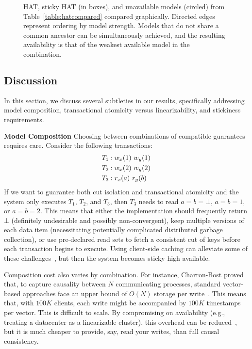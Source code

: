 \begin{figure}[t!]
\label{fig:hat-order}
\caption{HAT, sticky HAT (in boxes), and unavailable models (circled)
  from Table~\protect\ref{table:hatcompared} compared
  graphically. Directed edges represent ordering by model
  strength. Models that do not share a common ancestor can be
  simultaneously achieved, and the resulting availability is that of
  the weakest available model in the combination.}
\label{fig:hatcompared}
\end{figure}


\subsection{Discussion}
\label{sec:discussion}

In this section, we discuss several subtleties in our results,
specifically addressing model composition, transactional atomicity
versus linearizability, and stickiness requirements.

\vspace{.5em}\noindent\textbf{Model Composition} Choosing between
combinations of compatible guarantees requires care. Consider the
following transactions:
\begin{align*}
\small
T_1 &: w_x(1)~w_y(1)
\\T_2 &: w_x(2)~w_y(2)
\\T_3 &: r_x(a)~r_y(b)
\end{align*}
If we want to guarantee both cut isolation and transactional atomicity
and the system only executes $T_1$, $T_2$, and $T_3$, then $T_3$ needs
to read $a=b=\bot$, $a=b=1$, or $a=b=2$. This means that either the
implementation should frequently return $\bot$ (definitely undesirable
and possibly non-convergent), keep multiple versions of each data item
(necessitating potentially complicated distributed garbage
collection), or use pre-declared read sets to fetch a consistent cut
of keys before each transaction begins to execute. Using client-side
caching can alleviate some of these challenges~\cite{bolton, swift},
but then the system becomes sticky high available.

Composition cost also varies by combination. For instance, Charron-Bost
 proved that, to capture causality between $N$ communicating
processes, standard vector-based approaches face an upper bound of
$O(N)$ storage per write~\cite{charron-bost}. This means that, with
$100K$ clients, each write might be accompanied by $100K$ timestamps
per vector. This is difficult to scale. By compromising on
availability (e.g., treating a datacenter as a linearizable cluster),
this overhead can be reduced~\cite{eiger}, but it is much
cheaper to provide, say, read your writes, than full causal
consistency.

